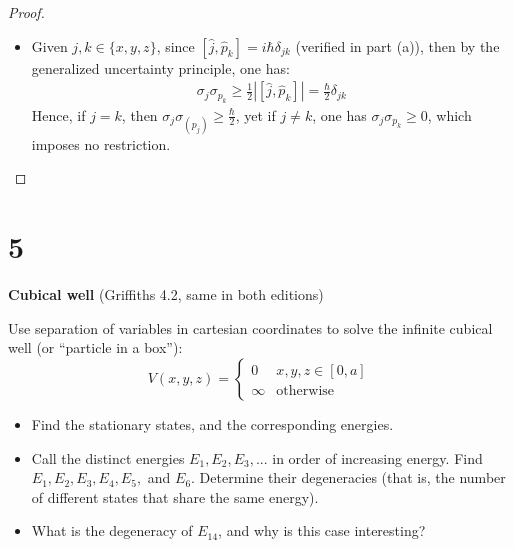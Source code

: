 \documentclass{article}
\begin{document}
\begin{proof}
\begin{itemize}
        \hfil
    
        \item[(c)] Given $j,k \in \{x,y,z\}$, since $[\hat{j},\hat{p}_k] = i\hbar \delta_{j k}$ (verified in part (a)), then by the generalized uncertainty principle, one has:
        \begin{align}
            \sigma_j \sigma_{p_k} \geq \frac{1}{2}\left|[\hat{j},\hat{p}_k]\right| = \frac{\hbar}{2}\delta_{j k}
        \end{align}
        Hence, if $j=k$, then $\sigma_j \sigma_(p_j)\geq \frac{\hbar}{2}$, yet if $j\neq k$, one has $\sigma_j\sigma_{p_k}\geq 0$, which imposes no restriction.
    \end{itemize}
\end{proof}

\newpage

\section*{5}

\begin{ques}\label{q5}
\textbf{Cubical well} (Griffiths 4.2, same in both editions)

Use separation of variables in cartesian coordinates to solve the infinite cubical well (or ``particle in a box''):
$$V(x,y,z) = \begin{cases}
    0 & x,y,z \in [0,a]\\
    \infty & \text{otherwise}
\end{cases}$$
\begin{itemize}
    \item[(a)] Find the stationary states, and the corresponding energies.
    \item[(b)] Call the distinct energies $E_1,E_2,E_3,...$ in order of increasing energy. Find $E_1,E_2,E_3,E_4,E_5,$ and $E_6$.  Determine their degeneracies (that is, the number of different states that share the same energy).
    \item[(c)] What is the degeneracy of $E_{14}$, and why is this case interesting?
\end{itemize}
\end{ques}
\end{document}
